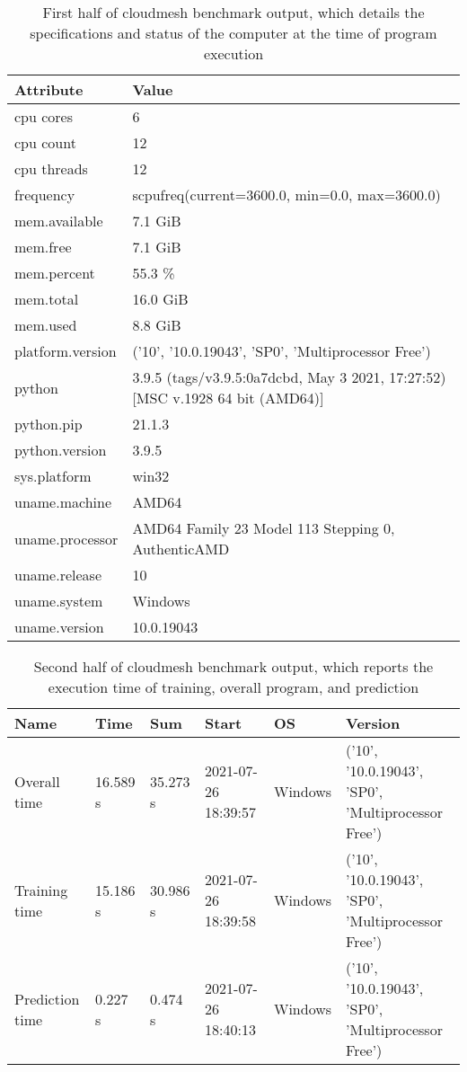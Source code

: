 \documentclass[acmtog,authorversion]{acmart}
\begin{document}
\begin{table}[htb]
\caption{First half of cloudmesh benchmark output, which details the specifications and status of the computer at the time of program execution}
\label{tab:resource}
\begin{tabular}{p{2cm}p{5cm}}
Attribute        & Value  \\
\hline
 cpu cores        & 6    \\
 cpu count        & 12   \\
 cpu threads      & 12    \\
 frequency        & scpufreq(current=3600.0, min=0.0, max=3600.0)       \\
 mem.available    & 7.1 GiB \\
 mem.free         & 7.1 GiB \\
 mem.percent      & 55.3 \%  \\
 mem.total        & 16.0 GiB \\
 mem.used         & 8.8 GiB  \\
 platform.version & ('10', '10.0.19043', 'SP0', 'Multiprocessor Free') \\
 python           & 3.9.5 (tags/v3.9.5:0a7dcbd, May  3 2021, 17:27:52) [MSC v.1928 64 bit (AMD64)]  \\
 python.pip       & 21.1.3   \\
 python.version   & 3.9.5 \\
 sys.platform     & win32  \\
 uname.machine    & AMD64          \\
 uname.processor  & AMD64 Family 23 Model 113 Stepping 0, AuthenticAMD   \\
 uname.release    & 10        \\
 uname.system     & Windows \\
 uname.version    & 10.0.19043 \\
 \hline
 \end{tabular}
 \end{table}



\begin{table*}[htb]
\caption{Second half of cloudmesh benchmark output, which reports the execution time of training, overall program, and prediction}
\label{tab:second}
\begin{tabular}{llllll}
Name            &   Time   &    Sum   & Start               & OS      & Version \\
\hline
 Overall time    & 16.589 s & 35.273 s & 2021-07-26 18:39:57 & Windows & ('10', '10.0.19043', 'SP0', 'Multiprocessor Free') \\
Training time   & 15.186 s & 30.986 s & 2021-07-26 18:39:58 & Windows & ('10', '10.0.19043', 'SP0', 'Multiprocessor Free') \\
 Prediction time &  0.227 s &  0.474 s & 2021-07-26 18:40:13 & Windows & ('10', '10.0.19043', 'SP0', 'Multiprocessor Free') \\
 \hline
 \end{tabular}
 \end{table*}
 
\end{document}
